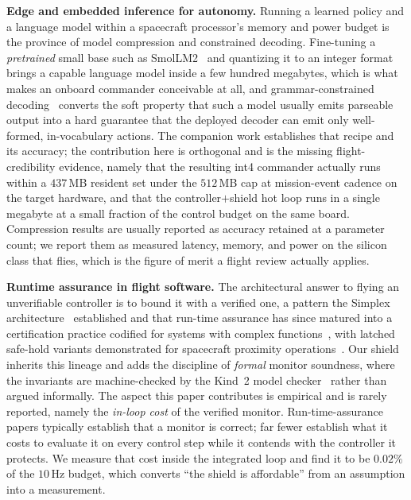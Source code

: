 \documentclass[11pt]{article}
\begin{document}
\noindent\textbf{Edge and embedded inference for autonomy.} Running a learned policy and a
language model within a spacecraft processor's memory and power budget is the province of model
compression and constrained decoding. Fine-tuning a \emph{pretrained} small base such as
SmolLM2~\cite{SmolLM2} and quantizing it to an integer format brings a capable language model
inside a few hundred megabytes, which is what makes an onboard commander conceivable at all, and
grammar-constrained decoding~\cite{Geng2023} converts the soft property that such a model usually
emits parseable output into a hard guarantee that the deployed decoder can emit only well-formed,
in-vocabulary actions. The companion work establishes that recipe and its accuracy; the
contribution here is orthogonal and is the missing flight-credibility evidence, namely that the
resulting int4 commander actually runs within a $437$\,MB resident set under the $512$\,MB cap at
mission-event cadence on the target hardware, and that the controller$+$shield hot loop runs in a
single megabyte at a small fraction of the control budget on the same board. Compression results
are usually reported as accuracy retained at a parameter count; we report them as measured
latency, memory, and power on the silicon class that flies, which is the figure of merit a flight
review actually applies.

\noindent\textbf{Runtime assurance in flight software.} The architectural answer to flying an
unverifiable controller is to bound it with a verified one, a pattern the Simplex
architecture~\cite{Sha2001} established and that run-time assurance has since matured into a
certification practice codified for systems with complex functions~\cite{ASTMF3269}, with latched
safe-hold variants demonstrated for spacecraft proximity operations~\cite{Dunlap2023}. Our shield
inherits this lineage and adds the discipline of \emph{formal} monitor soundness, where the
invariants are machine-checked by the Kind~2 model checker~\cite{Champion2016} rather than argued
informally. The aspect this paper contributes is empirical and is rarely reported, namely the
\emph{in-loop cost} of the verified monitor. Run-time-assurance papers typically establish that a
monitor is correct; far fewer establish what it costs to evaluate it on every control step while
it contends with the controller it protects. We measure that cost inside the integrated loop and
find it to be $0.02\%$ of the $10$\,Hz budget, which converts ``the shield is affordable'' from an
assumption into a measurement.
\end{document}

